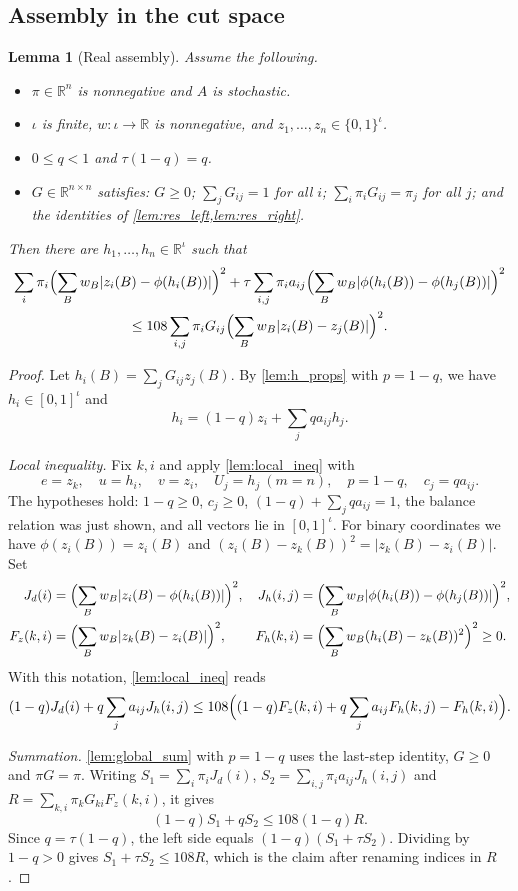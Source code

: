 \documentclass[11pt]{article}
\newtheorem{lemma}[theorem]{Lemma}
\theoremstyle{definition}
\theoremstyle{remark}
\newcommand{\R}{\mathbb{R}}
\begin{document}
\subsection{Assembly in the cut space}

\begin{lemma}[Real assembly]\label{lem:assembly_real}
Assume the following.
\begin{itemize}
\item $\pi\in\R^n$ is nonnegative and $A$ is stochastic.
\item $\iota$ is finite, $w:\iota\to\R$ is nonnegative, and $z_1,\dots,z_n\in\{0,1\}^\iota$.
\item $0\le q<1$ and $\tau(1-q)=q$.
\item $G\in\R^{n\times n}$ satisfies: $G\ge0$; $\sum_jG_{ij}=1$ for all $i$; $\sum_i\pi_iG_{ij}=\pi_j$ for all $j$; and the identities of \cref{lem:res_left,lem:res_right}.
\end{itemize}
Then there are $h_1,\dots,h_n\in\R^\iota$ such that
\begin{multline*}
\sum_i\pi_i\Bigl(\sum_Bw_B|z_i(B)-\phi(h_i(B))|\Bigr)^2+\tau\sum_{i,j}\pi_ia_{ij}\Bigl(\sum_Bw_B|\phi(h_i(B))-\phi(h_j(B))|\Bigr)^2\\
\le108\sum_{i,j}\pi_iG_{ij}\Bigl(\sum_Bw_B|z_i(B)-z_j(B)|\Bigr)^2 .
\end{multline*}
\end{lemma}
\begin{proof}
Let $h_i(B)=\sum_jG_{ij}z_j(B)$. By \cref{lem:h_props} with $p=1-q$, we have $h_i\in[0,1]^\iota$ and
\[
h_i=(1-q)z_i+\sum_jqa_{ij}h_j .
\]

\emph{Local inequality.} Fix $k,i$ and apply \cref{lem:local_ineq} with
\[
e=z_k,\quad u=h_i,\quad v=z_i,\quad U_j=h_j\ (m=n),\quad p=1-q,\quad c_j=qa_{ij}.
\]
The hypotheses hold: $1-q\ge0$, $c_j\ge0$, $(1-q)+\sum_jqa_{ij}=1$, the balance relation was just shown, and all vectors lie in $[0,1]^\iota$. For binary coordinates we have $\phi(z_i(B))=z_i(B)$ and $(z_i(B)-z_k(B))^2=|z_k(B)-z_i(B)|$. Set
\begin{align*}
J_d(i)&=\Bigl(\sum_Bw_B|z_i(B)-\phi(h_i(B))|\Bigr)^2, & J_h(i,j)&=\Bigl(\sum_Bw_B|\phi(h_i(B))-\phi(h_j(B))|\Bigr)^2,\\
F_z(k,i)&=\Bigl(\sum_Bw_B|z_k(B)-z_i(B)|\Bigr)^2, & F_h(k,i)&=\Bigl(\sum_Bw_B(h_i(B)-z_k(B))^2\Bigr)^2\ge0 .
\end{align*}
With this notation, \cref{lem:local_ineq} reads
\[
(1-q)J_d(i)+q\sum_ja_{ij}J_h(i,j)\le108\Bigl((1-q)F_z(k,i)+q\sum_ja_{ij}F_h(k,j)-F_h(k,i)\Bigr).
\]

\emph{Summation.} \cref{lem:global_sum} with $p=1-q$ uses the last-step identity, $G\ge0$ and $\pi G=\pi$. Writing $S_1=\sum_i\pi_iJ_d(i)$, $S_2=\sum_{i,j}\pi_ia_{ij}J_h(i,j)$ and $R=\sum_{k,i}\pi_kG_{ki}F_z(k,i)$, it gives
\[
(1-q)S_1+qS_2\le108(1-q)R .
\]
Since $q=\tau(1-q)$, the left side equals $(1-q)(S_1+\tau S_2)$. Dividing by $1-q>0$ gives $S_1+\tau S_2\le108R$, which is the claim after renaming indices in $R$.
\end{proof}
\end{document}
